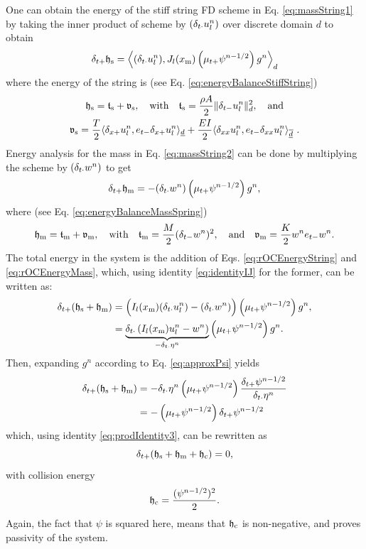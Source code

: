 One can obtain the energy of the stiff string FD scheme in Eq. \eqref{eq:massString1} by taking the inner product of scheme by $(\delta_{t\cdot} u_l^n)$ over discrete domain $d$ to obtain 
\begin{equation}\label{eq:rOCEnergyString}
    \delta_{t+} \mathfrak{h}_\text{s} = \left\langle (\delta_{t\cdot} u_l^n), J_l(x_\text{m})\left(\mu_{t+} \psi^{n-1/2}\right)g^n\right\rangle_d
\end{equation}
where the energy of the string is (see Eq. \eqref{eq:energyBalanceStiffString})
\begin{equation*}
    \begin{gathered}
        \mathfrak{h}_\text{s} = \mathfrak{t}_\text{s} + \mathfrak{v}_\text{s}, \quad \text{with} \quad \mathfrak{t}_\text{s} = \frac{\rho A}{2}\lVert\delta_{t-} u_l^n\rVert^2_d,\quad \text{and} \\
        \mathfrak{v}_\text{s} = \frac{T}{2}\langle\delta_{x+}u_l^n, e_{t-}\delta_{x+}u_l^n\rangle_{\underline{d}} + \frac{EI}{2}\langle\delta_{xx}u_l^n, e_{t-}\delta_{xx}u_l^n\rangle_{\overline{\underline{d}}}\ .
    \end{gathered}
\end{equation*}
Energy analysis for the mass in Eq. \eqref{eq:massString2} can be done by multiplying the scheme by $(\delta_{t\cdot} w^n)$ to get 
\begin{equation}\label{eq:rOCEnergyMass}
    \delta_{t+} \mathfrak{h}_\text{m} = -(\delta_{t\cdot} w^n)\left(\mu_{t+} \psi^{n-1/2}\right)g^n,
\end{equation}
where (see Eq. \eqref{eq:energyBalanceMassSpring})
\begin{equation*}
    \mathfrak{h}_\text{m} = \mathfrak{t}_\text{m} + \mathfrak{v}_\text{m}, \quad \text{with} \quad \mathfrak{t}_\text{m} = \frac{M}{2}(\delta_{t-} w^n)^2, \quad \text{and} \quad \mathfrak{v}_\text{m} = \frac{K}{2}w^n e_{t-}w^n.
\end{equation*}
The total energy in the system is the addition of Eqs. \eqref{eq:rOCEnergyString} and \eqref{eq:rOCEnergyMass}, which, using identity \eqref{eq:identityIJ} for the former, can be written as:
\begin{align*}
    \delta_{t+}(\mathfrak{h}_\text{s} + \mathfrak{h}_\text{m}) &= \Big(I_l(x_\text{m})(\delta_{t\cdot} u_l^n) - (\delta_{t\cdot} w^n)\Big)\left(\mu_{t+} \psi^{n-1/2}\right)g^n,\\
    &= \underbrace{\delta_{t\cdot}\left(I_l(x_\text{m})u_l^n - w^n\right)}_{-\delta_{t\cdot} \eta^n}\left(\mu_{t+} \psi^{n-1/2}\right)g^n.
\end{align*}
Then, expanding $g^n$ according to Eq. \eqref{eq:approxPsi} yields 
\begin{align*}
    \delta_{t+}(\mathfrak{h}_\text{s} + \mathfrak{h}_\text{m}) &= - \delta_{t\cdot}\eta^n\left(\mu_{t+} \psi^{n-1/2}\right)\frac{\delta_{t+}\psi^{n-1/2}}{\delta_{t\cdot}\eta^n}\\
    &= -\left(\mu_{t+} \psi^{n-1/2}\right)\delta_{t+}\psi^{n-1/2}
\end{align*}
which, using identity \eqref{eq:prodIdentity3}, can be rewritten as
\begin{equation}
    \delta_{t+}(\mathfrak{h}_\text{s} + \mathfrak{h}_\text{m} + \mathfrak{h}_\text{c}) = 0,
\end{equation}
with collision energy
\begin{equation*}
    \mathfrak{h}_\text{c} = \frac{(\psi^{n-1/2})^2}{2}.
\end{equation*}
Again, the fact that $\psi$ is squared here, means that $\mathfrak{h}_\text{c}$ is non-negative, and proves passivity of the system. 

